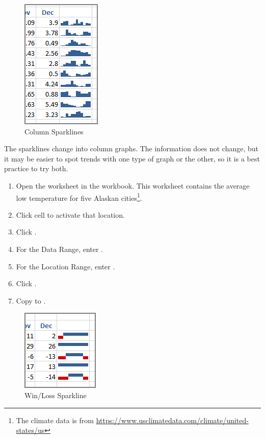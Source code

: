 \begin{figure}[H]
	\centering
	\includegraphics[width=\maxwidth{.50\linewidth}]{gfx/ch08_fig05}
	\caption{Column Sparklines}
	\label{08:fig05}
\end{figure}

The sparklines change into column graphs. The information does not change, but it may be easier to spot trends with one type of graph or the other, so it is a best practice to try both.

\begin{enumbox}
	\begin{enumerate}
		\item Open the  worksheet in the  workbook. This worksheet contains the average low temperature for five Alaskan cities\footnote{The climate data is from  \url{https://www.usclimatedata.com/climate/united-states/us}}.
		\item Click cell  to activate that location.
		\item Click .
		\item For the Data Range, enter .
		\item For the Location Range, enter .
		\item Click .
		\item Copy  to .
	\end{enumerate}
\end{enumbox}
	
\begin{figure}[H]
	\centering
	\includegraphics[width=\maxwidth{.50\linewidth}]{gfx/ch08_fig06}
	\caption{Win/Loss Sparkline}
	\label{08:fig06}
\end{figure}

